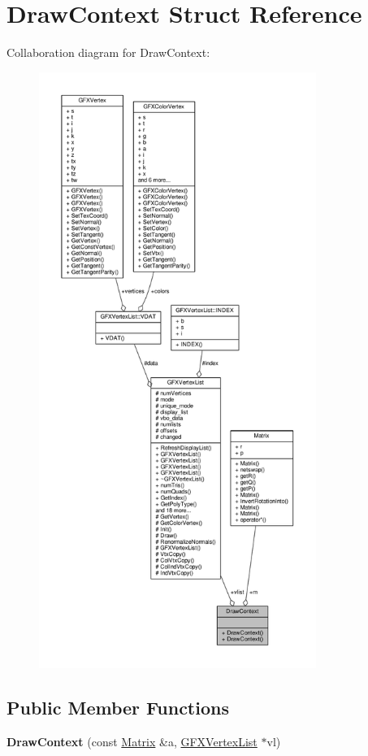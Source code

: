 \hypertarget{structDrawContext}{}\section{Draw\+Context Struct Reference}
\label{structDrawContext}


Collaboration diagram for Draw\+Context\+:
\nopagebreak
\begin{figure}[H]
\begin{center}
\leavevmode
\includegraphics[height=550pt]{df/dd9/structDrawContext__coll__graph}
\end{center}
\end{figure}
\subsection*{Public Member Functions}
\begin{DoxyCompactItemize}
\item 
{\bfseries Draw\+Context} (const \hyperlink{classMatrix}{Matrix} \&a, \hyperlink{classGFXVertexList}{G\+F\+X\+Vertex\+List} $\ast$vl)\hypertarget{structDrawContext_abdebe5d3a41d5d230250ad465ce3eca3}{}\label{structDrawContext_abdebe5d3a41d5d230250ad465ce3eca3}

\end{DoxyCompactItemize}
